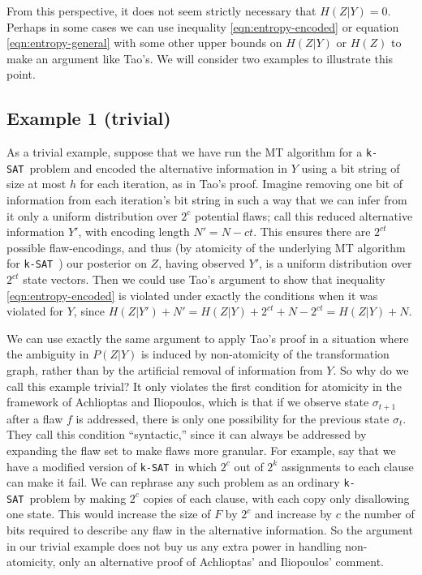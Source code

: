 \documentclass[twocolumn]{article}
\newcommand{\ksat}{\texttt{k-SAT}~}
\begin{document}
From this perspective, it does not seem strictly necessary that $H(Z | Y) = 0$.  Perhaps in some cases we can use inequality \ref{eqn:entropy-encoded} or equation \ref{eqn:entropy-general} with some other upper bounds on $H(Z | Y)$ or $H(Z)$ to make an argument like Tao's.  We will consider two examples to illustrate this point.

\subsection{Example 1 (trivial)}
\label{subsec:trivial}
As a trivial example, suppose that we have run the MT algorithm for a \ksat problem and encoded the alternative information in $Y$ using a bit string of size at most $h$ for each iteration, as in Tao's proof.  Imagine removing one bit of information from each iteration's bit string in such a way that we can infer from it only a uniform distribution over $2^c$ potential flaws; call this reduced alternative information $Y'$, with encoding length $N' = N - ct$.  This ensures there are $2^{ct}$ possible flaw-encodings, and thus (by atomicity of the underlying MT algorithm for \ksat) our posterior on $Z$, having observed $Y'$, is a uniform distribution over $2^{ct}$ state vectors.  Then we could use Tao's argument to show that inequality \ref{eqn:entropy-encoded} is violated under exactly the conditions when it was violated for $Y$, since $H(Z | Y') + N' = H(Z | Y) + 2^{ct} + N - 2^{ct} = H(Z | Y) + N$.

We can use exactly the same argument to apply Tao's proof in a situation where the ambiguity in $P(Z | Y)$ is induced by non-atomicity of the transformation graph, rather than by the artificial removal of information from $Y$.  So why do we call this example trivial?  It only violates the first condition for atomicity in the framework of Achlioptas and Iliopoulos, which is that if we observe state $\sigma_{t+1}$ after a flaw $f$ is addressed, there is only one possibility for the previous state $\sigma_t$.  They call this condition ``syntactic,'' since it can always be addressed by expanding the flaw set to make flaws more granular.  For example, say that we have a modified version of \ksat in which $2^c$ out of $2^k$ assignments to each clause can make it fail.  We can rephrase any such problem as an ordinary \ksat problem by making $2^c$ copies of each clause, with each copy only disallowing one state.  This would increase the size of $F$ by $2^c$ and increase by $c$ the number of bits required to describe any flaw in the alternative information.  So the argument in our trivial example does not buy us any extra power in handling non-atomicity, only an alternative proof of Achlioptas' and Iliopoulos' comment.
\end{document}
